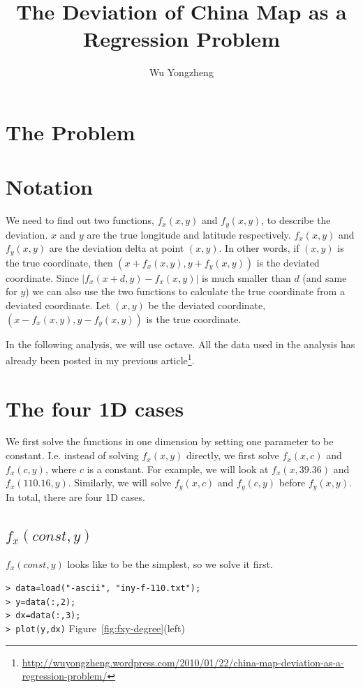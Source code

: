 \documentclass[a4paper]{article}
\begin{document}
\title{The Deviation of China Map as a Regression Problem}
\author{Wu Yongzheng}

\maketitle

\section{The Problem}

\section{Notation}
We need to find out two functions, $f_x(x,y)$ and $f_y(x,y)$, to describe the
deviation. $x$ and $y$ are the true longitude and latitude respectively.
$f_x(x,y)$ and $f_y(x,y)$ are the deviation delta at point $(x,y)$.
In other words, if $(x,y)$ is the true coordinate, then
$(x+f_x(x,y),y+f_y(x,y))$ is the deviated coordinate.
Since $|f_x(x+d,y)-f_x(x,y)|$ is much smaller than $d$ (and same for $y$)
we can also
use the two functions to calculate the true coordinate from a deviated
coordinate.
Let $(x,y)$ be the deviated coordinate, $(x-f_x(x,y),y-f_y(x,y))$ is the
true coordinate.

In the following analysis, we will use octave.
All the data used in the analysis has already been posted in my previous
article\footnote{\url{http://wuyongzheng.wordpress.com/2010/01/22/china-map-deviation-as-a-regression-problem/}}.

\section{The four 1D cases}

We first solve the functions in one dimension by setting one parameter to be
constant.
I.e. instead of solving $f_x(x,y)$ directly, we first solve $f_x(x,c)$
and $f_x(c,y)$, where $c$ is a constant.
For example, we will look at $f_x(x,39.36)$ and $f_x(110.16,y)$.
Similarly, we will solve $f_y(x,c)$ and $f_y(c,y)$ before $f_y(x,y)$.
In total, there are four 1D cases.

\subsection{$f_x(const,y)$}
$f_x(const,y)$ looks like to be the simplest, so we solve it first.

\noindent
\verb|> data=load("-ascii", "iny-f-110.txt");| \\
\verb|> y=data(:,2);| \\
\verb|> dx=data(:,3);| \\
\verb|> plot(y,dx)| \hfill Figure~\ref{fig:fxy-degree}(left)
\end{document}
